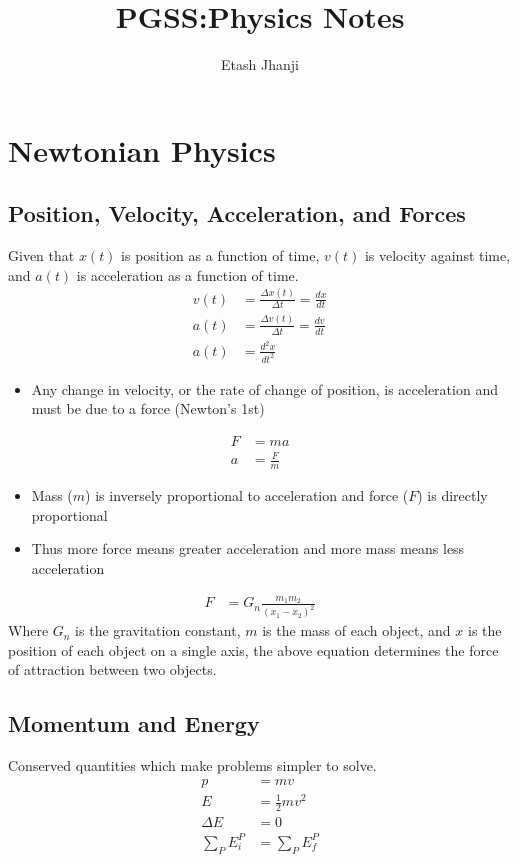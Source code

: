 \documentclass[12pt,letterpaper, twocolumn]{article}
\author{Etash Jhanji}
\title{PGSS:\@ Physics Notes}
\date{}
\begin{document}
\maketitle


\section{Newtonian Physics}
    \subsection{Position, Velocity, Acceleration, and Forces}
    Given that $x(t)$ is position as a function of time, $v(t)$ is velocity against time, and $a(t)$ is acceleration as a function of time. 
    \begin{align*}
        v(t) &= \frac{\Delta x(t)}{\Delta t} = \frac{dx}{dt}\\
        a(t) &= \frac{\Delta v(t)}{\Delta t} = \frac{dv}{dt}\\
        a(t) &= \frac{d^2x}{dt^2}
    \end{align*}
    \begin{itemize}
        \item[] Any change in velocity, or the rate of change of position, is acceleration and must be due to a force (Newton's 1st)
    \end{itemize}
    \begin{align*}
        F&=ma\\
        a &= \frac{F}{m}
    \end{align*}
    \begin{itemize}
        \item[] Mass ($m$) is inversely proportional to acceleration and force ($F$) is directly proportional
        \item[] Thus more force means greater acceleration and more mass means less acceleration
    \end{itemize}
    \begin{align*}
        F&=G_n\frac{m_1m_2}{(x_1-x_2)^2}
    \end{align*}
    Where $G_n$ is the gravitation constant, $m$ is the mass of each object, and $x$ is the position of each object on a single axis, the above equation determines the force of attraction between two objects.
    
    \subsection{Momentum and Energy}
    Conserved quantities which make problems simpler to solve.
    \begin{align*}
        p &= mv\\
        E &= \frac{1}{2}mv^2\\
        \Delta E &= 0 \\
        \sum_{P} E_i^P &= \sum_{P} E_f^P 
    \end{align*}
\end{document}
